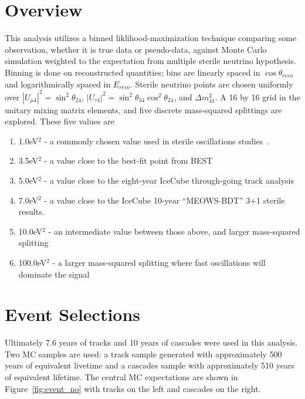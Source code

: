 \documentclass[main.tex]{subfiles}
\begin{document}
\section{Overview}

This analysis utilizes a binned liklihood-maximization technique comparing some observation, whether it is true data or pseudo-data, against Monte Carlo simulation weighted to the expectation from multiple sterile neutrino hypothesis. 
Binning is done on reconstructed quantities; bins are linearly spaced in $\cos\theta_{reco}$ and logarithmically spaced in $E_{reco}$. 
Sterile neutrino points are chosen uniformly over $\left|U_{\mu 4}\right|^{2}=\sin^{2}\theta_{24}$, $\left|U_{\tau 4}\right|^{2}=\sin^{2}\theta_{34}\cos^{2}\theta_{24}$, and $\Delta m_{41}^{2}$. 
A 16 by 16 grid in the unitary mixing matrix elements, and five discrete mass-squared splittings are explored. 
These five values are 
\begin{enumerate}
    \item 1.0eV$^{2}$ - a commonly chosen value used in sterile oscillations studies~\cite{Aartsen_2017_dc, PhysRevD.91.052019, PhysRevD.105.052001}. 
    \item 3.5eV$^{2}$ - a value close to the best-fit point from BEST~\cite{barinov2021results}
    \item 5.0eV$^{2}$ - a value close to the eight-year IceCube through-going track analysis~\cite{Aartsen_2020, Aartsen_2020_prd}
    \item 7.0eV$^{2}$ - a value close to the IceCube 10-year ``MEOWS-BDT'' 3+1 sterile results. 
    \item 10.0eV$^{2}$ - an intermediate value between those above, and larger mass-squared splitting
    \item 100.0eV$^{2}$ - a larger mass-squared splitting where fast oscillations will dominate the signal
\end{enumerate}

\section{Event Selections}

Ultimately 7.6 years of tracks and 10 years of cascades were used in this analysis. 
Two MC samples are used: a track sample generated with approximately 500 years of equivalent livetime and a cascades sample with approximately 510 years of equivalent lifetime.
The central MC expectations are shown in Figure~\ref{fig:event_no} with tracks on the left and cascades on the right. 
\end{document}
